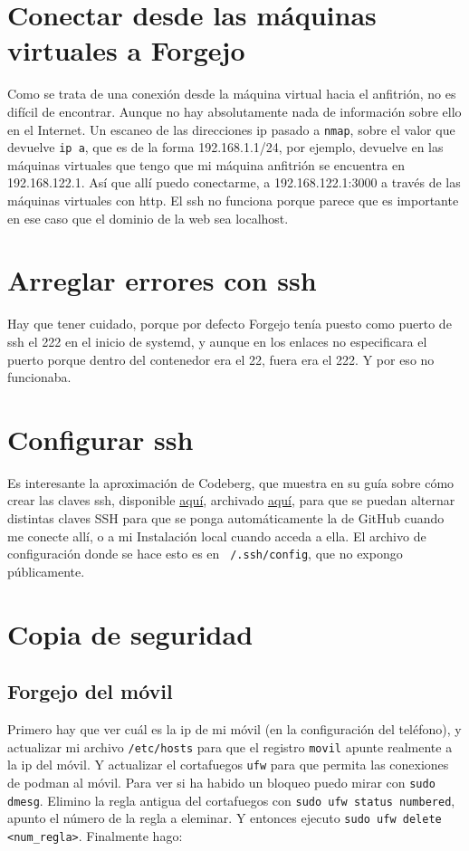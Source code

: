 \documentclass{article}
\begin{document}
    \section{Conectar desde las máquinas virtuales a Forgejo}
    Como se trata de una conexión desde la máquina virtual hacia el anfitrión, no
    es difícil de encontrar. Aunque no hay absolutamente nada de información sobre
    ello en el Internet. Un escaneo de las direcciones ip pasado a \texttt{nmap}, sobre
    el valor que devuelve \texttt{ip a}, que es de la forma 192.168.1.1/24, por ejemplo,
    devuelve en las máquinas virtuales que tengo que mi máquina anfitrión se encuentra en
    192.168.122.1. Así que allí puedo conectarme, a 192.168.122.1:3000 a través de las
    máquinas virtuales con http. El ssh no funciona porque parece que es importante
    en ese caso que el dominio de la web sea localhost.

    \section{Arreglar errores con ssh}
    Hay que tener cuidado, porque por defecto Forgejo tenía puesto como puerto de ssh el 222
    en el inicio de systemd, y aunque en los enlaces no especificara el
    puerto porque dentro del contenedor era el 22, fuera era el 222. Y por eso
    no funcionaba.

    \section{Configurar ssh}
    Es interesante la aproximación de Codeberg, que muestra en su guía sobre cómo crear
    las claves ssh, disponible \href{https://docs.codeberg.org/security/ssh-key/}{aquí},
    archivado \href{https://web.archive.org/web/20260205114835/https://docs.codeberg.org/security/ssh-key/}
    {aquí}, para que se puedan alternar distintas claves SSH para que se ponga
    automáticamente la de GitHub cuando me conecte allí, o a mi Instalación
    local cuando acceda a ella. El archivo de configuración donde se hace esto es
    en \texttt{~/.ssh/config}, que no expongo públicamente.

    \section{Copia de seguridad}
    \subsection{Forgejo del móvil}
    Primero hay que ver cuál es la ip de mi móvil (en la configuración del teléfono),
    y actualizar mi archivo \texttt{/etc/hosts} para que el registro \texttt{movil}
    apunte realmente a la ip del móvil. Y actualizar el cortafuegos \texttt{ufw} para que
    permita las conexiones de podman al móvil. Para ver si ha habido un bloqueo puedo
    mirar con \texttt{sudo dmesg}. Elimino la regla antigua del cortafuegos con
    \texttt{sudo ufw status numbered}, apunto el número de la regla a eleminar. Y
    entonces ejecuto \texttt{sudo ufw delete <num\_regla>}. Finalmente hago:
\end{document}
